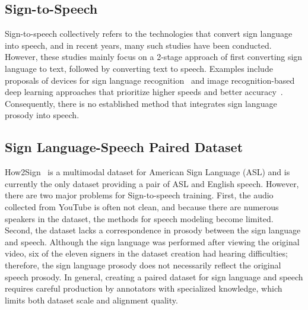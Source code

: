 \subsection{Sign-to-Speech}
Sign-to-speech collectively refers to the technologies that convert sign language into speech, and in recent years, many such studies have been conducted. However, these studies mainly focus on a 2-stage approach of first converting sign language to text, followed by converting text to speech. Examples include proposals of devices for sign language recognition~\cite{Zhou2020Sign-to-speech,Sharma2020Sign,Dangat2023Sign} and image recognition-based deep learning approaches that prioritize higher speeds and better accuracy~\cite{Ojha2020Sign,R2022Indian}. Consequently, there is no established method that integrates sign language prosody into speech.

\subsection{Sign Language-Speech Paired Dataset}\label{sec:paired_dataset}
How2Sign~\cite{Duarte_2021_CVPR} is a multimodal dataset for American Sign Language (ASL) and is currently the only dataset providing a pair of ASL and English speech.
However, there are two major problems for Sign-to-speech training.
First, the audio collected from YouTube is often not clean, and because there are numerous speakers in the dataset, the methods for speech modeling become limited.
Second, the dataset lacks a correspondence in prosody between the sign language and speech. Although the sign language was performed after viewing the original video, six of the eleven signers in the dataset creation had hearing difficulties; therefore, the sign language prosody does not necessarily reflect the original speech prosody.
In general, creating a paired dataset for sign language and speech requires careful production by annotators with specialized knowledge, which limits both dataset scale and alignment quality.

